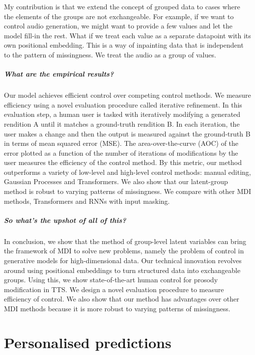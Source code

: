 \documentclass[backrefs]{cam-thesis}
\begin{document}
My contribution is that we extend the concept of grouped data to cases where the elements of the groups are not exchangeable. For example, if we want to control audio generation, we might want to provide a few values and let the model fill-in the rest. What if we treat each value as a separate datapoint with its own positional embedding. This is a way of inpainting data that is independent to the pattern of missingness. We treat the audio as a group of values.

\paragraph{What are the empirical results?} Our model achieves efficient control over competing control methods. We measure efficiency using a novel evaluation procedure called iterative refinement. In this evaluation step, a human user is tasked with iteratively modifying a generated rendition A until it matches a ground-truth rendition B. In each iteration, the user makes a change and then the output is measured against the ground-truth B in terms of mean squared error (MSE). The area-over-the-curve (AOC) of the error plotted as a function of the number of iterations of modifications by the user measures the efficiency of the control method. By this metric, our method outperforms a variety of low-level and high-level control methods: manual editing, Gaussian Processes and Transformers. We also show that our latent-group method is robust to varying patterns of missingness. We compare with other MDI methods, Transformers and RNNs with input masking.

\paragraph{So what's the upshot of all of this?} In conclusion, we show that the method of group-level latent variables can bring the framework of MDI to solve new problems, namely the problem of control in generative models for high-dimensional data. Our technical innovation revolves around using positional embeddings to turn structured data into exchangeable groups. Using this, we show state-of-the-art human control for prosody modification in TTS. We design a novel evaluation procedure to measure efficiency of control. We also show that our method has advantages over other MDI methods because it is more robust to varying patterns of missingness.

\chapter{Personalised predictions}
\end{document}
